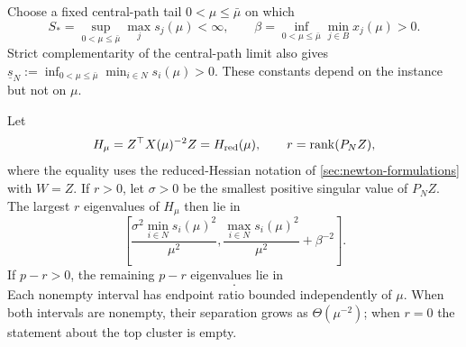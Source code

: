 Choose a fixed central-path tail $0<\mu\leq\bar\mu$ on which
\begin{equation}
 S_*=\sup_{0<\mu\leq\bar\mu}\max_j s_j(\mu)<\infty,
 \qquad
 \beta=\inf_{0<\mu\leq\bar\mu}\min_{j\in B}x_j(\mu)>0.
 \label{eq:spectra-tail-constants}
\end{equation}
Strict complementarity of the central-path limit also gives
$\underline s_N:=\inf_{0<\mu\leq\bar\mu}\min_{i\in N}s_i(\mu)>0$.
These constants depend on the instance but not on $\mu$.

\begin{proposition}
\label{prop:two-cluster-hessian}
Let
\begin{equation}
 H_\mu=Z^\top X(\mu)^{-2}Z=H_{\rm red}(\mu),
 \qquad r=\operatorname{rank}(P_NZ),
 \label{eq:two-cluster-hessian}
\end{equation}
where the equality uses the reduced-Hessian notation of
\cref{sec:newton-formulations} with $W=Z$.  If $r>0$, let $\sigma>0$ be the smallest positive singular
value of $P_NZ$.  The largest $r$ eigenvalues of $H_\mu$ then lie in
\begin{equation}
 \left[
  \frac{\sigma^2\min_{i\in N}s_i(\mu)^2}{\mu^2},
  \frac{\max_{i\in N}s_i(\mu)^2}{\mu^2}+\beta^{-2}
 \right].
 \label{eq:two-cluster-top}
\end{equation}
If $p-r>0$, the remaining $p-r$ eigenvalues lie in
\begin{equation}
 [D_P^{-2},\,\beta^{-2}].
 \label{eq:two-cluster-bottom}
\end{equation}
Each nonempty interval has endpoint ratio bounded independently of $\mu$.
When both intervals are nonempty, their separation grows as
$\Theta(\mu^{-2})$; when $r=0$ the statement about the top cluster is empty.
\end{proposition}

